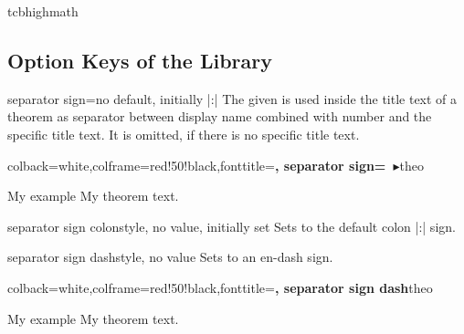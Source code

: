 \begin{docCommand}{tcbhighmath}{}
\end{docCommand}


\clearpage
\subsection{Option Keys of the Library}


\begin{docTcbKey}{separator sign}{=}{no default, initially |:|}
  The given  is used inside the title text of a theorem
  as separator between display name combined with number and
  the specific title text. It is omitted, if there is no specific title text.

\begin{dispExample}
%
  {colback=white,colframe=red!50!black,fonttitle=\bfseries,
   separator sign={\ $\blacktriangleright$}}{theo}
\begin{sometheorem}{My example}{}
My theorem text.
\end{sometheorem}
\end{dispExample}
\end{docTcbKey}

\begin{docTcbKey}{separator sign colon}{}{style, no value, initially set}
Sets  to the default colon |:| sign.
\end{docTcbKey}

\begin{docTcbKey}{separator sign dash}{}{style, no value}
Sets  to an en-dash sign.
\begin{dispExample}
%
  {colback=white,colframe=red!50!black,fonttitle=\bfseries,
   separator sign dash}{theo}
\begin{sometheorem}{My example}{}
My theorem text.
\end{sometheorem}
\end{dispExample}
\end{docTcbKey}

